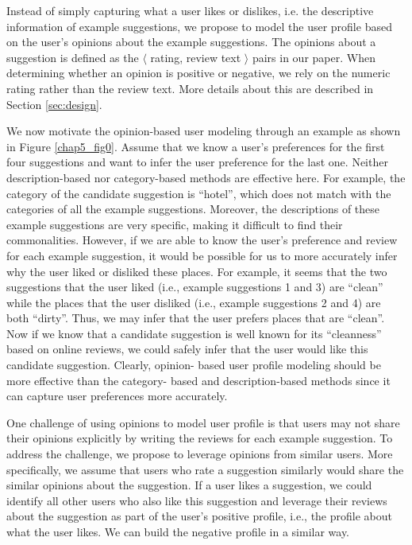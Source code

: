 Instead of simply capturing what a user likes or dislikes, 
i.e. the descriptive information of example suggestions, we propose to 
model the user profile based on the user's opinions about the example suggestions. 
The opinions about a suggestion is defined as the $\langle$ rating, 
review text $\rangle$ pairs in our paper.  
When determining whether an opinion is positive or negative, we rely on the 
numeric rating rather than the review text. 
More details about this are described in Section \ref{sec:design}. 

We now motivate the opinion-based user modeling through an example as shown 
in Figure \ref{chap5_fig0}. 
Assume that we know a user's preferences for the first four suggestions and 
want to infer the user preference for the last one. Neither description-based 
nor category-based methods are effective here. For example, the category of 
the candidate suggestion is ``hotel'', which does not match with the categories 
of all the example suggestions. Moreover, the descriptions of these example 
suggestions are very specific, making it difficult to find their commonalities. 
However, if we are able to know the user's preference and review for each 
example suggestion, it would be possible for us to more accurately infer why 
the user liked or disliked these places. 
For example, it seems that the two suggestions that the user liked 
(i.e., example suggestions 1 and 3) are ``clean'' while the places that the 
user disliked (i.e., example suggestions  2 and 4) are both 
``dirty''. Thus, we may infer that the user prefers places that are 
``clean''. Now if we know that a candidate suggestion is well known for 
its ``cleanness'' based on online reviews, we could safely infer 
that the user would like this candidate suggestion. Clearly, opinion-
based user profile modeling should be more effective than the category-
based and description-based methods since it can capture user 
preferences more accurately. 


One challenge of using opinions to model user profile is that users may 
not share their opinions explicitly by writing the reviews for each 
example suggestion. To address the challenge, we propose to leverage 
opinions from similar users. More specifically, we assume that users 
who rate a suggestion similarly would share the similar opinions about 
the suggestion. If a user likes a suggestion, we could identify all 
other users who also like this suggestion and leverage their reviews 
about the suggestion as part of the user's positive profile, i.e., the 
profile about what the user likes. We can build the negative profile in 
a similar way.

